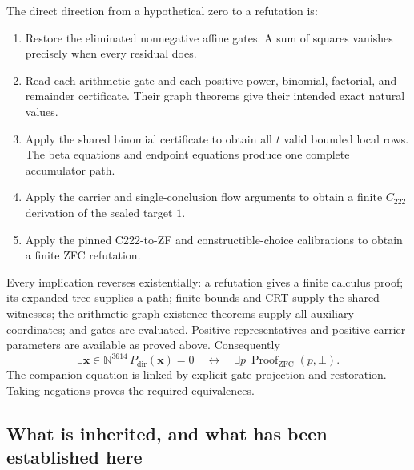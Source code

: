 \documentclass[11pt,letterpaper]{article}
\newcommand{\N}{\mathbb N}
\newcommand{\ZFC}{\mathrm{ZFC}}
\begin{document}
The direct direction from a hypothetical zero to a refutation is:
\begin{enumerate}
\item Restore the eliminated nonnegative affine gates. A sum of squares
      vanishes precisely when every residual does.
\item Read each arithmetic gate and each positive-power, binomial,
      factorial, and remainder certificate. Their graph theorems give
      their intended exact natural values.
\item Apply the shared binomial certificate to obtain all $t$ valid
      bounded local rows. The beta equations and endpoint equations
      produce one complete accumulator path.
\item Apply the carrier and single-conclusion flow arguments to obtain
      a finite $C_{222}$ derivation of the sealed target $1$.
\item Apply the pinned C222-to-ZF and constructible-choice calibrations
      to obtain a finite ZFC refutation.
\end{enumerate}
Every implication reverses existentially: a refutation gives a finite
calculus proof; its expanded tree supplies a path; finite bounds and CRT
supply the shared witnesses; the arithmetic graph existence theorems
supply all auxiliary coordinates; and gates are evaluated. Positive
representatives and positive carrier parameters are available as proved
above. Consequently
\[
 \exists\boldsymbol{x}\in\N^{3614}\,
 P_{\mathrm{dir}}(\boldsymbol{x})=0
 \quad\longleftrightarrow\quad
 \exists p\ \operatorname{Proof}_{\ZFC}(p,\bot).
\]
The companion equation is linked by explicit gate projection and
restoration. Taking negations proves the required equivalences.

\subsection{What is inherited, and what has been established here}
\end{document}
